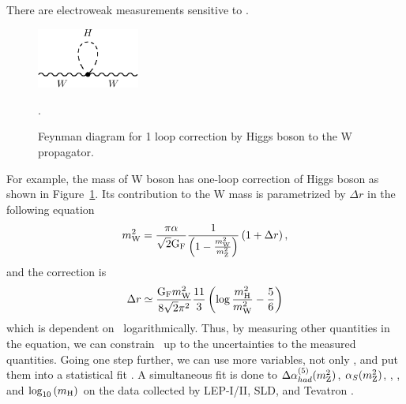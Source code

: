 There are electroweak measurements sensitive to \mHi. 
\begin{figure}[t]
\centering
\includegraphics[width=0.3\textwidth]{figures/FD_Wmass_Hloop.pdf}
\caption{Feynman diagram for 1 loop correction by Higgs boson to the W propagator.}.
\label{fig:FD_Wmass_Hloop}
\end{figure}
For example, the mass of W boson has one-loop correction of Higgs boson 
as shown in Figure~\ref{fig:FD_Wmass_Hloop}. Its contribution to the W mass 
is parametrized by $\Delta r$ in the following equation~\cite{Djouadi20081} %
\begin{eqnarray} 
m_{\mathrm{W}}^2 
= 
\frac{\pi\alpha}{\sqrt{2} \mathrm{G_{\mathrm{F}}}} 
\frac{1}{\left( 1 - \frac{m_{\mathrm{W}}^2}{m_{\mathrm{Z}}^2} \right)} 
\left( 1 + \Delta r \right),
\end{eqnarray} 
and the correction is 
\begin{eqnarray}
\Delta r \simeq 
\frac{\mathrm{G_{\mathrm{F}}} m_{\mathrm{W}}^2}{8 \sqrt{2} \pi^2} \frac{11}{3} 
\left( \log \frac{m_{\mathrm{H}}^2}{m_{\mathrm{W}}^2} - \frac{5}{6} \right)
\end{eqnarray} 
which is dependent on \mHi\ logarithmically. Thus, by measuring other quantities 
in the equation, we can constrain \mHi\ up to the uncertainties to the measured 
quantities. Going one step further, we can use more variables, not only \mW, 
and put them into a statistical fit \cite{LEP-2}. A simultaneous fit is done to
$\Delta \alpha_{had}^{(5)}(m_{\mathrm{Z}}^2)$, $\alpha_S(m_{\mathrm{Z}}^2)$,  
\mZ, \mt, and  $\log_{10} \left( m_{\mathrm{H}} \right)$
on the data collected by LEP-I/II, SLD, and Tevatron \cite{LEP-2}.  
